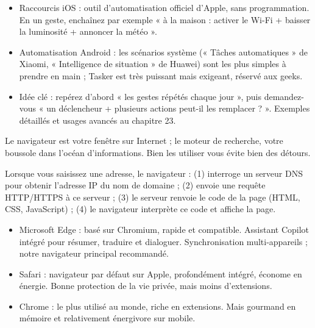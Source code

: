 \begin{itemize}
  \item Raccourcis iOS : outil d'automatisation officiel d'Apple, sans programmation. En un geste, enchaînez par exemple « à la maison : activer le Wi-Fi + baisser la luminosité + annoncer la météo ».
  \item Automatisation Android : les scénarios système (« Tâches automatiques » de Xiaomi, « Intelligence de situation » de Huawei) sont les plus simples à prendre en main ; Tasker est très puissant mais exigeant, réservé aux geeks.
  \item Idée clé : repérez d'abord « les gestes répétés chaque jour », puis demandez-vous « un déclencheur + plusieurs actions peut-il les remplacer ? ». Exemples détaillés et usages avancés au chapitre 23.
\end{itemize}


Le navigateur est votre fenêtre sur Internet ; le moteur de recherche, votre boussole dans l'océan d'informations. Bien les utiliser vous évite bien des détours.


Lorsque vous saisissez une adresse, le navigateur : (1) interroge un serveur DNS pour obtenir l'adresse IP du nom de domaine ; (2) envoie une requête HTTP/HTTPS à ce serveur ; (3) le serveur renvoie le code de la page (HTML, CSS, JavaScript) ; (4) le navigateur interprète ce code et affiche la page.


\begin{itemize}
  \item Microsoft Edge : basé sur Chromium, rapide et compatible. Assistant Copilot intégré pour résumer, traduire et dialoguer. Synchronisation multi-appareils ; notre navigateur principal recommandé.
  \item Safari : navigateur par défaut sur Apple, profondément intégré, économe en énergie. Bonne protection de la vie privée, mais moins d'extensions.
  \item Chrome : le plus utilisé au monde, riche en extensions. Mais gourmand en mémoire et relativement énergivore sur mobile.
\end{itemize}



